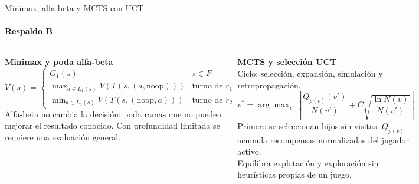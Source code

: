 \documentclass[aspectratio=169,10pt,t]{beamer}
\begin{document}
\begin{frame}{Minimax, alfa-beta y MCTS con UCT}
\framesubtitle{Respaldo B}
\footnotesize
\begin{columns}[T]
\begin{tarjeta}[vino]
{\bfseries Minimax y poda alfa-beta}\\[2pt]
$V(s)=\begin{cases}G_1(s) & s\in F\\ \max_{a\in L_1(s)}V(T(s,(a,\text{noop}))) & \text{turno de }r_1\\ \min_{a\in L_2(s)}V(T(s,(\text{noop},a))) & \text{turno de }r_2\end{cases}$\\[3pt]
Alfa-beta no cambia la decisión: poda ramas que no pueden mejorar el resultado conocido. Con profundidad limitada se requiere una evaluación general.
\end{tarjeta}
\begin{tarjeta}[azulp]
{\bfseries MCTS y selección UCT}\\[2pt]
Ciclo: selección, expansión, simulación y retropropagación.\\[2pt]
$v^{*}=\arg\max_{v'}\left[\dfrac{Q_{p(v)}(v')}{N(v')}+C\sqrt{\dfrac{\ln N(v)}{N(v')}}\right]$\\[3pt]
Primero se seleccionan hijos sin visitas. $Q_{p(v)}$ acumula recompensas normalizadas del jugador activo.\\[2pt]
Equilibra explotación y exploración sin heurísticas propias de un juego.
\end{tarjeta}
\end{columns}
\end{frame}
\end{document}
